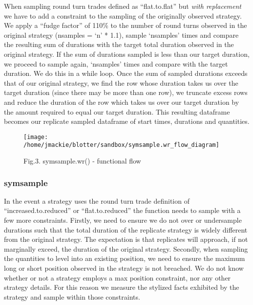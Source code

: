 When sampling round turn trades defined as ``flat.to.flat'' but
\emph{with replacement} we have to add a constraint to the sampling of
the originally observed strategy. We apply a ``fudge factor'' of 110\%
to the number of round turns observed in the original strategy (nsamples
= `n' * 1.1), sample `nsamples' times and compare the resulting sum of
durations with the target total duration observed in the original
strategy. If the sum of durations sampled is less than our target
duration, we proceed to sample again, `nsamples' times and compare with
the target duration. We do this in a while loop. Once the sum of sampled
durations exceeds that of our original strategy, we find the row whose
duration takes us over the target duration (since there may be more than
one row), we truncate excess rows and reduce the duration of the row
which takes us over our target duration by the amount required to equal
our target duration. This resulting dataframe becomes our replicate
sampled dataframe of start times, durations and quantities.

\begin{Schunk}
\begin{figure}

{\centering \texttt{[image: /home/jmackie/blotter/sandbox/symsample.wr\_flow\_diagram]} 

}

\caption[Fig.3]{Fig.3. symsample.wr() - functional flow}\label{fig:symsample.wr flow diagram diagram}
\end{figure}
\end{Schunk}

\hypertarget{symsample}{%
\subsubsection{symsample}\label{symsample}}

In the event a strategy uses the round turn trade definition of
``increased.to.reduced'' or ``flat.to.reduced'' the function needs to
sample with a few more constraints. Firstly, we need to ensure we do not
over or undersample durations such that the total duration of the
replicate strategy is widely different from the original strategy. The
expectation is that replicates will approach, if not marginally exceed,
the duration of the original strategy. Secondly, when sampling the
quantities to level into an existing position, we need to ensure the
maximum long or short position observed in the strategy is not breached.
We do not know whether or not a strategy employs a max position
constraint, nor any other strategy details. For this reason we measure
the stylized facts exhibited by the strategy and sample within those
constraints.


